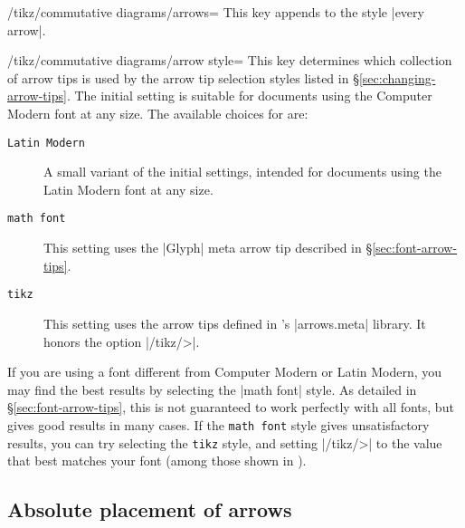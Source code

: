 \documentclass[a4paper]{ltxdoc}
\begin{document}
\begin{key}{/tikz/commutative diagrams/arrows=}
  This key appends  to the style |every arrow|.
\end{key}

\begin{key}{/tikz/commutative diagrams/arrow style=}
  This key determines which collection of arrow tips is used by the
  arrow tip selection styles listed in
  \S\ref{sec:changing-arrow-tips}.  The initial setting is suitable
  for documents using the Computer Modern font at any size.  The
  available choices for  are:
  \begin{description}
  \item[\texttt{Latin Modern}] A small variant of the initial
    settings, intended for documents using the Latin Modern font at
    any size.
  \item[\texttt{math font}] This setting uses the |Glyph| meta arrow
    tip described in \S\ref{sec:font-arrow-tips}.
  \item[\texttt{tikz}] This setting uses the arrow tips defined in
    \tikzname's |arrows.meta| library.  It honors the option
    |/tikz/>|.
  \end{description}
\end{key}

If you are using a font different from Computer Modern or Latin
Modern, you may find the best results by selecting the |math font|
style.  As detailed in \S\ref{sec:font-arrow-tips}, this is not
guaranteed to work perfectly with all fonts, but gives good results in
many cases.  If the \texttt{math font} style gives unsatisfactory
results, you can try selecting the \texttt{tikz} style, and setting
|/tikz/>| to the value that best matches your font (among those shown
in \cite[\S\ref*{pgfman-section-arrows-meta}]{pgfman}).

\begin{codeexample}[]
  
\end{codeexample}

\subsection{Absolute placement of arrows}
\label{sec:absol-positioning}
\end{document}
